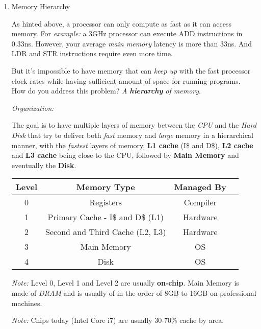 \documentclass[12pt]{article}
\newenvironment{QandA}{\begin{enumerate}[label=\bfseries\arabic*.]\bfseries}
                      {\end{enumerate}}
\newenvironment{answered}{\par\quad\normalfont}{}
\begin{document}
\begin{QandA}
\item Memory Hierarchy
\begin{answered}
As hinted above, a processor can only compute as fast as it can access memory. For \textit{example:} a 3GHz processor can execute ADD instructions in 0.33ns. However, your average \textit{main memory} latency is more than 33ns. And LDR and STR instructions require even more time.

But it's impossible to have memory that can \textit{keep up} with the fast processor clock rates while having sufficient amount of space for running programs. How do you address this problem? \textit{A \textbf{hierarchy} of memory}.

\textit{Organization:}

The goal is to have multiple layers of memory between the \textit{CPU} and the \textit{Hard Disk} that try to deliver both \textit{fast} memory and \textit{large} memory in a hierarchical manner, with the \textit{fastest} layers of memory, \textbf{L1 cache} (I\$ and D\$), \textbf{L2 cache} and \textbf{L3 cache} being close to the CPU, followed by \textbf{Main Memory} and eventually the \textbf{Disk}.

\begin{center}
\begin{tabular}{ |c|c|c|c| } 
\hline
Level & Memory Type & Managed By \\
\hline
0 & Registers & Compiler \\ 
1 & Primary Cache - I\$ and D\$ (L1) & Hardware \\ 
2 & Second and Third Cache (L2, L3) & Hardware \\ 
3 & Main Memory & OS \\ 
4 & Disk & OS \\ 
\hline
\end{tabular}
\end{center}

\textit{Note:} Level 0, Level 1 and Level 2 are usually \textbf{on-chip}. Main Memory is made of \textit{DRAM} and is usually of in the order of 8GB to 16GB on professional machines. 

\textit{Note:} Chips today (Intel Core i7) are usually 30-70\% cache by area.

\end{answered}


\end{QandA}
\end{document}
